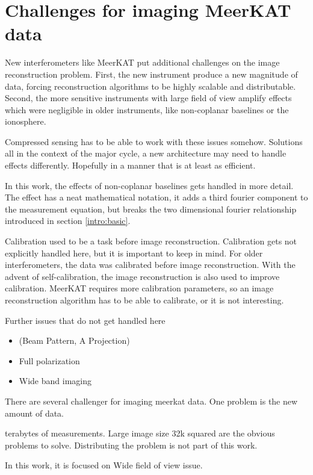 \section{Challenges for imaging MeerKAT data} \label{meerkat}
New interferometers like MeerKAT put additional challenges on the image reconstruction problem. First, the new instrument produce a new magnitude of data, forcing reconstruction algorithms to be highly scalable and distributable. Second, the more sensitive instruments with large field of view amplify effects which were negligible in older instruments, like non-coplanar baselines or the ionosphere.

Compressed sensing has to be able to work with these issues somehow. Solutions all in the context of the major cycle, a new architecture may need to handle effects differently. Hopefully in a manner that is at least as efficient.

In this work, the effects of non-coplanar baselines gets handled in more detail. The effect has a neat mathematical notation, it adds a third fourier component to the measurement equation, but breaks the two dimensional fourier relationship introduced in section \ref{intro:basic}. 

Calibration used to be a task before image reconstruction.
Calibration gets not explicitly handled here, but it is important to keep in mind. For older interferometers, the data was calibrated before image reconstruction. With the advent of self-calibration, the image reconstruction is also used to improve calibration. MeerKAT requires more calibration parameters, so an image reconstruction algorithm has to be able to calibrate, or it is not interesting.



Further issues that do not get handled here
\begin{itemize}
	\item (Beam Pattern, A Projection)
	\item Full polarization
	\item Wide band imaging
\end{itemize}

There are several challenger for imaging meerkat data. One problem is the new amount of data.

terabytes of measurements. Large image size 32k squared are the obvious problems to solve. Distributing the problem is not part of this work.

 In this work, it is focused on Wide field of view issue. 







